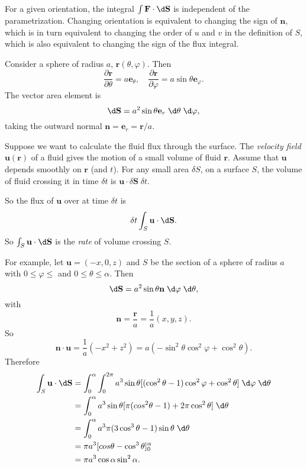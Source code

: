 \documentclass[a4paper]{article}
\begin{document}
For a given orientation, the integral $\int \mathbf{F}\cdot \d \mathbf{S}$ is independent of the parametrization. Changing orientation is equivalent to changing the sign of $\mathbf{n}$, which is in turn equivalent to changing the order of $u$ and $v$ in the definition of $S$, which is also equivalent to changing the sign of the flux integral.

\begin{eg}
  Consider a sphere of radius $a$, $\mathbf{r}(\theta, \varphi)$. Then
  \[
    \frac{\partial \mathbf{r}}{\partial \theta} = a\mathbf{e}_\theta,\quad \frac{\partial \mathbf{r}}{\partial \varphi} = a\sin \theta \mathbf{e}_\varphi.
  \]
  The vector area element is
  \[
    \d \mathbf{S} = a^2\sin \theta \mathbf{e}_r \;\d \theta\; \d\varphi,
  \]
  taking the outward normal $\mathbf{n} = \mathbf{e}_r = \mathbf{r}/a$.

  Suppose we want to calculate the fluid flux through the surface. The \emph{velocity field} $\mathbf{u}(\mathbf{r})$ of a fluid gives the motion of a small volume of fluid $\mathbf{r}$. Assume that $\mathbf{u}$ depends smoothly on $\mathbf{r}$ (and $t$). For any small area $\delta S$, on a surface $S$, the volume of fluid crossing it in time $\delta t$ is $\mathbf{u}\cdot \delta \mathbf{S}\; \delta t$.
  \begin{center}
  \end{center}
  So the flux of $\mathbf{u}$ over at time $\delta t$ is
  \[
    \delta t\int_S \mathbf{u}\cdot \d \mathbf{S}.
  \]
  So $\int_S \mathbf{u}\cdot \d \mathbf{S}$ is the \emph{rate} of volume crossing $S$.

  For example, let $\mathbf{u} = (-x, 0, z)$ and $S$ be the section of a sphere of radius $a$ with $0 \leq \varphi \leq$ and $0 \leq \theta \leq \alpha$. Then
  \[
    \d \mathbf{S} = a^2 \sin \theta \mathbf{n}\;\d \varphi \;\d \theta,
  \]
  with
  \[
    \mathbf{n} = \frac{\mathbf{r}}{a} = \frac{1}{a}(x, y, z).
  \]
  So
  \[
    \mathbf{n}\cdot \mathbf{u} = \frac{1}{a}(-x^2 + z^2) = a(-\sin^2\theta\cos^2\varphi + \cos^2 \theta).
  \]
  Therefore
  \begin{align*}
    \int_S \mathbf{u}\cdot \d \mathbf{S} &= \int_0^\alpha \int_0^{2\pi} a^3 \sin \theta[(\cos^2\theta - 1) \cos^2 \varphi + \cos^2 \theta]\;\d \varphi\;\d \theta\\
    &= \int_0^\alpha a^3\sin \theta[\pi(cos^2\theta - 1) + 2\pi \cos^2\theta]\; \d \theta\\
    &=\int_0^\alpha a^3\pi(3\cos^3 \theta - 1)\sin \theta\;\d \theta\\
    &= \pi a^3[cos\theta - \cos^3 \theta]_0^\alpha\\
    &= \pi a^3 \cos \alpha\sin^2 \alpha.
  \end{align*}
\end{eg}
\end{document}
